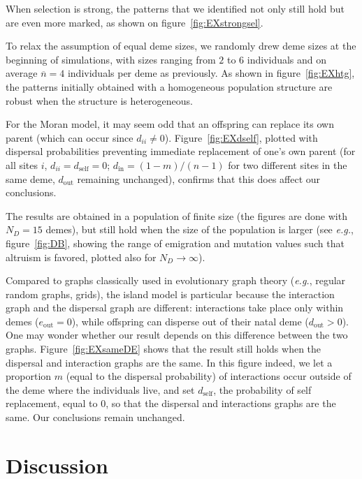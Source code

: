 \documentclass[11pt, letterpaper]{article}
\newcommand{\eg}{\textit{e.g.}}
\newcommand{\self}{\textrm{self}}
\newcommand{\inn}{\textrm{in}}
\newcommand{\out}{\textrm{out}}
\newcommand{\eout}{e_{\out}}
\newcommand{\din}{d_{\inn}}
\newcommand{\dself}{d_{\self}}
\newcommand{\dout}{d_{\out}}
\newcommand{\ndemes}{N_D}
\begin{document}
When selection is strong, the patterns that we identified not only still hold but are even more marked, as shown on figure~\ref{fig:EXstrongsel}. 

To relax the assumption of equal deme sizes, we randomly drew deme sizes at the beginning of simulations, with sizes ranging from $2$ to $6$ individuals and on average $\overline{n} = 4$ individuals per deme as previously. As shown in figure~\ref{fig:EXhtg}, the patterns initially obtained with a homogeneous population structure are robust when the structure is heterogeneous. 
 
For the Moran model, it may seem odd that an offspring can replace its own parent (which can occur since $d_{ii} \neq 0$). Figure~\ref{fig:EXdself}, plotted with dispersal probabilities preventing immediate replacement of one's own parent (for all sites $i$, $d_{ii}=\dself=0$; $\din = (1-m)/(n-1)$ for two different sites in the same deme, $\dout$ remaining unchanged), confirms that this does affect our conclusions. 

The results are obtained in a population of finite size (the figures are done with $\ndemes =15$ demes), but still hold when  the size of the population is larger (see \eg, figure~\ref{fig:DB}, showing the range of emigration and mutation values such that altruism is favored, plotted also for $\ndemes\to \infty$).

Compared to graphs classically used in evolutionary graph theory (\eg, regular random graphs, grids), the island model is particular because the interaction graph and the dispersal graph are different: interactions take place only within demes ($\eout = 0$), while offspring can disperse out of their natal deme ($\dout >0$). One may wonder whether our result depends on this difference between the two graphs. Figure~\ref{fig:EXsameDE} shows that the result still holds when the dispersal and interaction graphs are the same. In this figure indeed, we let a proportion $m$ (equal to the dispersal probability) of interactions occur outside of the deme where the individuals live, and set $\dself$, the probability of self replacement, equal to $0$, so that the dispersal and interactions graphs are the same. Our conclusions remain unchanged.



\section*{Discussion}
\end{document}
